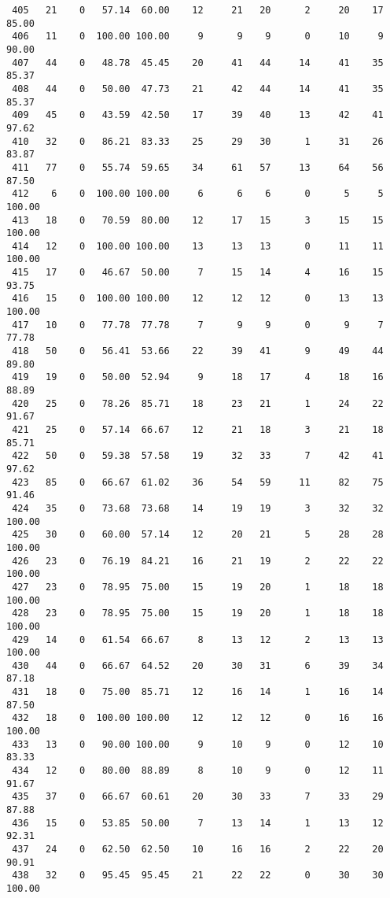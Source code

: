 \begin{verbatim}
 405   21    0   57.14  60.00    12     21   20      2     20    17    85.00
 406   11    0  100.00 100.00     9      9    9      0     10     9    90.00
 407   44    0   48.78  45.45    20     41   44     14     41    35    85.37
 408   44    0   50.00  47.73    21     42   44     14     41    35    85.37
 409   45    0   43.59  42.50    17     39   40     13     42    41    97.62
 410   32    0   86.21  83.33    25     29   30      1     31    26    83.87
 411   77    0   55.74  59.65    34     61   57     13     64    56    87.50
 412    6    0  100.00 100.00     6      6    6      0      5     5   100.00
 413   18    0   70.59  80.00    12     17   15      3     15    15   100.00
 414   12    0  100.00 100.00    13     13   13      0     11    11   100.00
 415   17    0   46.67  50.00     7     15   14      4     16    15    93.75
 416   15    0  100.00 100.00    12     12   12      0     13    13   100.00
 417   10    0   77.78  77.78     7      9    9      0      9     7    77.78
 418   50    0   56.41  53.66    22     39   41      9     49    44    89.80
 419   19    0   50.00  52.94     9     18   17      4     18    16    88.89
 420   25    0   78.26  85.71    18     23   21      1     24    22    91.67
 421   25    0   57.14  66.67    12     21   18      3     21    18    85.71
 422   50    0   59.38  57.58    19     32   33      7     42    41    97.62
 423   85    0   66.67  61.02    36     54   59     11     82    75    91.46
 424   35    0   73.68  73.68    14     19   19      3     32    32   100.00
 425   30    0   60.00  57.14    12     20   21      5     28    28   100.00
 426   23    0   76.19  84.21    16     21   19      2     22    22   100.00
 427   23    0   78.95  75.00    15     19   20      1     18    18   100.00
 428   23    0   78.95  75.00    15     19   20      1     18    18   100.00
 429   14    0   61.54  66.67     8     13   12      2     13    13   100.00
 430   44    0   66.67  64.52    20     30   31      6     39    34    87.18
 431   18    0   75.00  85.71    12     16   14      1     16    14    87.50
 432   18    0  100.00 100.00    12     12   12      0     16    16   100.00
 433   13    0   90.00 100.00     9     10    9      0     12    10    83.33
 434   12    0   80.00  88.89     8     10    9      0     12    11    91.67
 435   37    0   66.67  60.61    20     30   33      7     33    29    87.88
 436   15    0   53.85  50.00     7     13   14      1     13    12    92.31
 437   24    0   62.50  62.50    10     16   16      2     22    20    90.91
 438   32    0   95.45  95.45    21     22   22      0     30    30   100.00

\end{verbatim}
